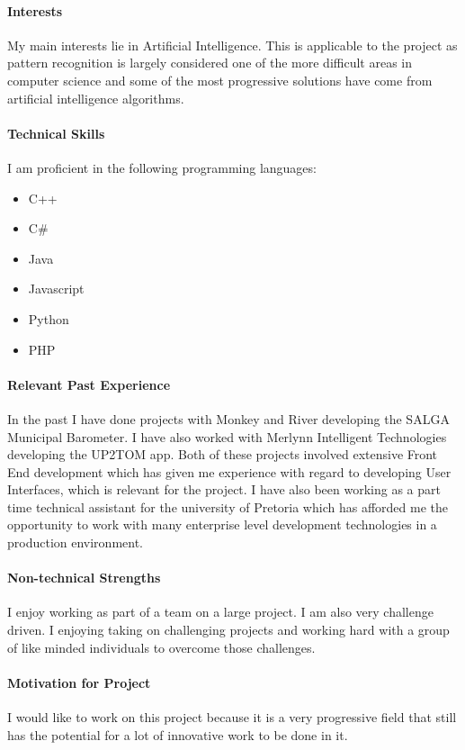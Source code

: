 \documentclass[12pt]{article}
\begin{document}
\paragraph{Interests}
My main interests lie in Artificial Intelligence. This is applicable to the project as pattern recognition is largely considered one of the more difficult areas in computer science and some of the most progressive solutions have come from artificial intelligence algorithms.
\paragraph{Technical Skills}
	I am proficient in the following programming languages:
	\begin{itemize}
		\item C++
		\item C#
		\item Java
		\item Javascript
		\item Python
		\item PHP
	\end{itemize}

\paragraph{Relevant Past Experience}
	In the past I have done projects with Monkey and River developing the SALGA Municipal Barometer. I have also worked with Merlynn Intelligent Technologies developing the UP2TOM app. Both of these projects involved extensive Front End development which has given me experience with regard to developing User Interfaces, which is relevant for the project. I have also been working as a part time technical assistant for the university of Pretoria which has afforded me the opportunity to work with many enterprise level development technologies in a production environment.

\paragraph{Non-technical Strengths} 
	I enjoy working as part of a team on a large project. I am also very challenge driven. I enjoying taking on challenging projects and working hard with a group of like minded individuals to overcome those challenges.

\paragraph{Motivation for Project}
	I would like to work on this project because it is a very progressive field that still has the potential for a lot of innovative work to be done in it.
\end{document}
